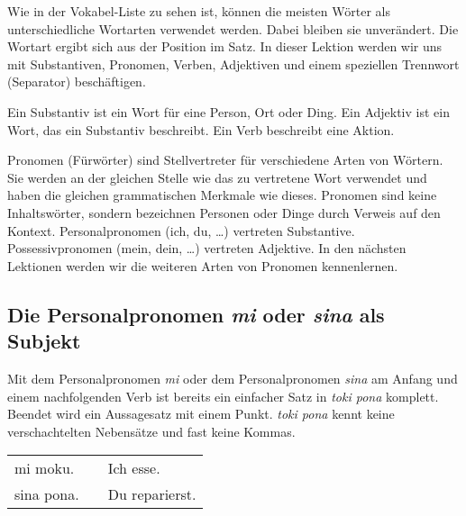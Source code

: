 Wie in der Vokabel-Liste zu sehen ist, können die meisten Wörter als unterschiedliche Wortarten verwendet werden. 
Dabei bleiben sie unverändert. 
Die Wortart ergibt sich aus der Position im Satz. 
In dieser Lektion werden wir uns mit Substantiven, Pronomen, Verben, Adjektiven und einem speziellen Trennwort (Separator) beschäftigen. 

Ein Substantiv ist ein Wort für eine Person, Ort oder Ding. 
Ein Adjektiv ist ein Wort, das ein Substantiv beschreibt. 
Ein Verb beschreibt eine Aktion. 

Pronomen (Fürwörter) sind Stellvertreter für verschiedene Arten von Wörtern. 
Sie werden an der gleichen Stelle wie das zu vertretene Wort verwendet und haben die gleichen grammatischen Merkmale wie dieses.
Pronomen sind keine Inhaltswörter, sondern bezeichnen Personen oder Dinge durch Verweis auf den Kontext. 
Personalpronomen (ich, du, \dots) vertreten Substantive. 
Possessivpronomen (mein, dein, \dots) vertreten Adjektive. 
In den nächsten Lektionen werden wir die weiteren Arten von Pronomen kennenlernen. 

%
\label{'predicate'}
\subsection*{Die Personalpronomen \textit{mi} oder \textit{sina} als Subjekt}
%
%

Mit dem Personalpronomen \textit{mi} oder dem Personalpronomen \textit{sina} am Anfang und einem nachfolgenden Verb ist bereits ein einfacher Satz in \textit{toki pona} komplett. 
Beendet wird ein Aussagesatz mit einem Punkt.
\textit{toki pona} kennt keine verschachtelten Nebensätze und fast keine Kommas.

\begin{supertabular}{p{5,5cm}|ll}
mi moku. && Ich esse. \\
sina pona. && Du reparierst. \\
\end{supertabular} 

